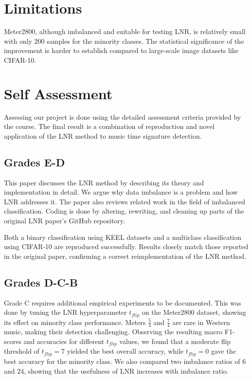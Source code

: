 \documentclass{article}
\begin{document}
\section{Limitations}

Meter2800, although imbalanced and suitable for testing LNR, is relatively small with only 200 samples for the minority classes. The statistical significance of the improvement is harder to establish compared to large-scale image datasets like CIFAR-10.

\section{Self Assessment}

Assessing our project is done using the detailed assessment criteria provided by the course. The final result is a combination of reproduction and novel application of the LNR method to music time signature detection.

\subsection{Grades E-D}

This paper discusses the LNR method by describing its theory and implementation in detail. We argue why data imbalance is a problem and how LNR addresses it. The paper also reviews related work in the field of imbalanced classification. Coding is done by altering, rewriting, and cleaning up parts of the original LNR paper's GitHub repository.

Both a binary classification using KEEL datasets and a multiclass classification using CIFAR-10 are reproduced successfully. Results closely match those reported in the original paper, confirming a correct reimplementation of the LNR method.


\subsection{Grades D-C-B}

Grade C requires additional empirical experiments to be documented. This was done by tuning the LNR hyperparameter $t_{flip}$ on the Meter2800 dataset, showing its effect on minority class performance. Meters $\frac{5}{4}$ and $\frac{7}{4}$ are rare in Western music, making their detection challenging. Observing the resulting macro F1-scores and accuracies for different $t_{flip}$ values, we found that a moderate flip threshold of $t_{flip} = 7$ yielded the best overall accuracy, while $t_{flip} = 0$ gave the best accuracy for the minority class. We also compared two imbalance ratios of $6$ and $24$, showing that the usefulness of LNR increases with imbalance ratio.
\end{document}
